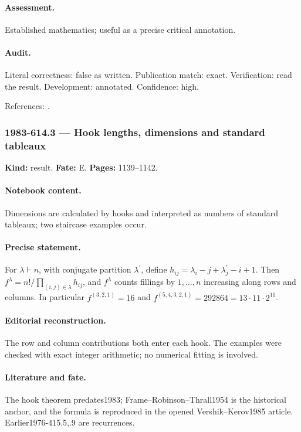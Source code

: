 \paragraph{Assessment.} Established mathematics; useful as a precise critical annotation.

\paragraph{Audit.} Literal correctness: false as written. Publication match: exact. Verification: read the result. Development: annotated. Confidence: high.

\noindent References: \citep{vershikkerov1985dimensions}.\par

\subsubsection{1983-614.3 --- Hook lengths, dimensions and standard tableaux}

\label{item:1983-614.3}

\noindent\textbf{Kind:} result. \textbf{Fate:} E. \textbf{Pages:} 1139--1142.\par

\paragraph{Notebook content.} Dimensions are calculated by hooks and interpreted as numbers of standard tableaux; two staircase examples occur.

\paragraph{Precise statement.} For $\lambda\vdash n$, with conjugate partition $\lambda^{\prime}$, define $h_{ij}=\lambda_i-j+\lambda_j^{\prime}-i+1$. Then $f^\lambda=n!/\prod_{(i,j)\in\lambda}h_{ij}$, and $f^\lambda$ counts fillings by $1,\ldots,n$ increasing along rows and columns. In particular $f^{(3,2,1)}=16$ and $f^{(5,4,3,2,1)}=292864=13\cdot11\cdot2^{11}$.

\paragraph{Editorial reconstruction.} The row and column contributions both enter each hook. The examples were checked with exact integer arithmetic; no numerical fitting is involved.

\paragraph{Literature and fate.} The hook theorem predates1983; Frame--Robinson--Thrall1954 is the historical anchor, and the formula is reproduced in the opened Vershik--Kerov1985 article. Earlier1976-415.5,.9 are recurrences.

